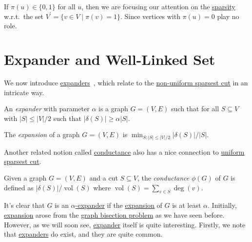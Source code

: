 \begin{remark}
	If \(\pi (u) \in \{ 0, 1 \} \) for all \(u\), then we are focusing our attention on the \hyperref[def:sparsity]{sparsity} w.r.t.\ the set \(V^{\prime} = \{ v \in V \mid \pi (v) = 1 \} \). Since vertices with \(\pi (u) = 0\) play no role.
\end{remark}

\section{Expander and Well-Linked Set}
We now introduce \hyperref[def:expander]{expanders}~\cite{hoory2006expander}, which relate to the \hyperref[prb:non-uniform-sparsest-cut]{non-uniform sparsest cut} in an intricate way.

\begin{definition}[Expander]\label{def:expander}
	An \emph{expander} with parameter \(\alpha \) is a graph \(G = (V, E)\) such that for all \(S \subseteq V\) with \(\lvert S \rvert \leq \lvert V \rvert / 2\) such that \(\lvert \delta (S) \rvert \geq \alpha \lvert S \rvert\).
\end{definition}

\begin{definition}[Expansion]\label{def:expansion}
	The \emph{expansion} of a graph \(G = (V, E)\) is \(\min _{S\colon \lvert S \rvert \leq \lvert V \rvert / 2} \lvert \delta (S) \rvert / \lvert S \rvert \).
\end{definition}

Another related notion called \hyperref[def:conductance]{conductance} also has a nice connection to \hyperref[prb:sparsest-cut]{uniform sparsest cut}.

\begin{definition}[Conductance]\label{def:conductance}
	Given a graph \(G = (V, E)\) and a cut \(S \subseteq V\), the \emph{conductance} \(\phi (G)\) of \(G\) is defined as \(\lvert \delta (S) \rvert / \operatorname{vol}(S) \) where \(\operatorname{vol}(S) = \sum_{v \in S} \deg(v)\).
\end{definition}

It's clear that \(G\) is an \hyperref[def:expander]{\(\alpha \)-expander} if the \hyperref[def:expansion]{expansion} of \(G\) is at least \(\alpha \). Initially, \hyperref[def:expansion]{expansion} arose from the \hyperref[prb:graph-bisection]{graph bisection problem} as we have seen before. However, as we will soon see, \hyperref[def:expander]{expander} itself is quite interesting. Firstly, we note that \hyperref[def:expander]{expanders} do exist, and they are quite common.

